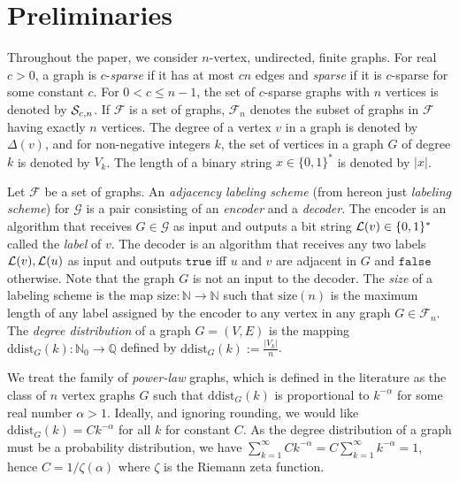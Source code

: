 
\section{Preliminaries}
Throughout the paper, we consider $n$-vertex, undirected, finite graphs.
For real $c > 0$, a graph is $c$-\emph{sparse} if it has at most $cn$ edges and \emph{sparse} if it is $c$-sparse for some constant $c$. For $0 < c \leq n-1$, the set of $c$-sparse graphs with $n$ vertices is denoted by $ \mathcal{S}_{c,n}$.
If $\mathcal{F}$ is a set of graphs,  $\mathcal{F}_n$ denotes the subset of graphs in $\mathcal{F}$ having exactly $n$
vertices. The degree of a vertex $v$ in a graph is denoted by $\Delta(v)$, and for non-negative integers $k$,
the set of vertices in a graph $G$ of degree $k$  is denoted by $V_k$.
The length of a binary string $x \in \{ 0,1 \}^*$ is denoted by $\vert x \vert$.

Let  $\mathcal{F}$ be a set of graphs. An  \emph{adjacency labeling scheme} (from hereon just \emph{labeling scheme}) for  $\mathcal{G}$
is a pair consisting of an \emph{encoder} and a \emph{decoder}. The encoder is an algorithm that receives $G \in \mathcal{G}$ as input and outputs a bit string $ \mathcal{L}(v) \in \{0,1\}^*$ called the \emph{label} of $v$. The decoder 
is an algorithm that receives any two labels $ \mathcal{L}(v), \mathcal{L}(u)$ as input and outputs $\mathtt{true}$ if{f} $u$ and $v$
are adjacent in $G$ and $\mathtt{false}$ otherwise. Note that the graph $G$ is not an input to the decoder.
The \emph{size} of a labeling scheme is the map $\textrm{size} : \mathbb{N} \longrightarrow \mathbb{N}$
such that $\textrm{size}(n)$ is the maximum length of any label assigned by the encoder to any vertex in
any graph $G \in \mathcal{F}_n$. The \emph{degree distribution} of a graph $G = (V,E)$ is the mapping
 $\mathrm{ddist}_G (k) : \mathbb{N}_0 \longrightarrow \mathbb{Q}$
defined by $\mathrm{ddist}_G (k) := \frac{\vert V_k \vert} {n}$.

We treat the family of \emph{power-law} graphs, which is defined in the literature as the class of $n$ vertex graphs $G$ such that $\mathrm{ddist}_G(k)$
is proportional to $k^{-\alpha}$ for some real number $\alpha > 1$. Ideally, and ignoring rounding, we would like $\mathrm{ddist}_G(k) = Ck^{-\alpha}$ for all $k$ for constant $C$. As the degree distribution of a graph must be a probability distribution, we have $\sum_{k=1}^\infty C k^{-\alpha} = C \sum_{k=1}^\infty k^{-\alpha} = 1$, hence  $C = 1/\zeta(\alpha)$ where $\zeta$ is the Riemann zeta function. 


